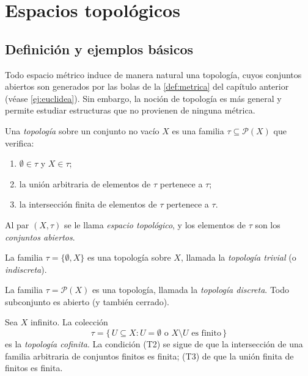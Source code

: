 \chapter{Espacios topológicos}
\label{ch:topologia}

\section{Definición y ejemplos básicos}

Todo espacio métrico induce de manera natural una topología, cuyos
conjuntos abiertos son generados por las bolas de la \cref{def:metrica} del
capítulo anterior (véase \cref{ej:euclidea}). Sin embargo, la noción de
topología es más general y permite estudiar estructuras que no provienen de
ninguna métrica.

\begin{definition}\label{def:topologia}
Una \emph{topología} sobre un conjunto no vacío $X$ es una familia
$\tau\subseteq\mathcal{P}(X)$ que verifica:
\begin{enumerate}
  \item[(T1)] $\emptyset\in\tau$ y $X\in\tau$;
  \item[(T2)] la unión arbitraria de elementos de $\tau$ pertenece a $\tau$;
  \item[(T3)] la intersección finita de elementos de $\tau$ pertenece a $\tau$.
\end{enumerate}
Al par $(X,\tau)$ se le llama \emph{espacio topológico}, y los elementos de
$\tau$ son los \emph{conjuntos abiertos}.
\end{definition}

\begin{example}\label{ej:top-trivial}
La familia $\tau=\{\emptyset,X\}$ es una topología sobre $X$, llamada la
\emph{topología trivial} (o \emph{indiscreta}).
\end{example}

\begin{example}\label{ej:top-discreta}
La familia $\tau=\mathcal{P}(X)$ es una topología, llamada la \emph{topología
discreta}. Todo subconjunto es abierto (y también cerrado).
\end{example}

\begin{example}\label{ej:top-cofinita}
Sea $X$ infinito. La colección
\[
  \tau=\{\,U\subseteq X : U=\emptyset\text{ o }X\setminus U\text{ es finito}\,\}
\]
es la \emph{topología cofinita}. La condición (T2) se sigue de que la
intersección de una familia arbitraria de conjuntos finitos es finita; (T3)
de que la unión finita de finitos es finita.
\end{example}


